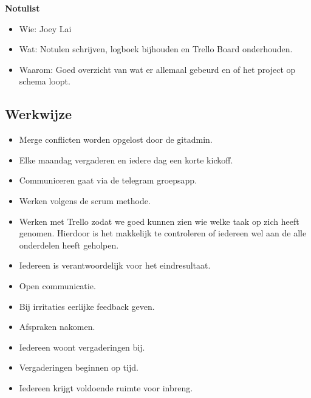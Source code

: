 \documentclass{uva-inf-article}
\begin{document}
\textbf{Notulist}
\begin{itemize}[noitemsep]
    \item Wie: Joey Lai
    \item Wat: Notulen schrijven, logboek bijhouden en Trello Board onderhouden.
    \item Waarom: Goed overzicht van wat er allemaal gebeurd en of het project op schema loopt.
\end{itemize}

\subsection{Werkwijze}
\begin{itemize}[noitemsep]
    \item Merge conflicten worden opgelost door de gitadmin.
    \item Elke maandag vergaderen en iedere dag een korte kickoff.
    \item Communiceren gaat via de telegram groepsapp.
    \item Werken volgens de scrum methode.
    \item Werken met Trello zodat we goed kunnen zien wie welke taak op zich heeft genomen. Hierdoor is het makkelijk te controleren of iedereen wel aan de alle onderdelen heeft geholpen.
    \item Iedereen is verantwoordelijk voor het eindresultaat.
    \item Open communicatie.
    \item Bij irritaties eerlijke feedback geven.
    \item Afspraken nakomen.
    \item Iedereen woont vergaderingen bij.
    \item Vergaderingen beginnen op tijd.
    \item Iedereen krijgt voldoende ruimte voor inbreng.
\end{itemize}


%


\end{document}
